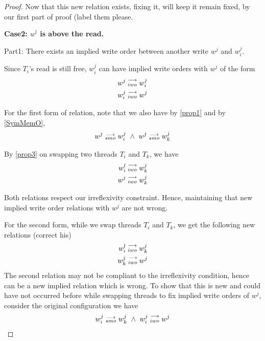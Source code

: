 \begin{proof}
                    Now that this new relation exists, fixing it, will keep it remain fixed, by our first part of proof (label them please. 
                    
            
            \textbf{Case2: $w^l$ is above the read.}
                
                Part1: There exists an implied write order between another write $w^j$ and $w_i^j$.

                Since $T_i$'s read is still free, $w_i^j$ can have implied write orders with $w^j$ of the form
                \begin{align}
                    w^j\stackrel{\longrightarrow}{_{iwo}}w_i^j \\
                    w_i^j\stackrel{\longrightarrow}{_{iwo}}w^j 
                \end{align}

                For the first form of relation, note that we also have by \ref{prop1} and by \ref{SymMemO}, 
                \begin{align}
                    \reln{w^j}{smo}{w_i^j} \ \wedge \ \reln{w^j}{smo}{w_k^j}
                \end{align}

                By \ref{prop3} on swapping two threads $T_i$ and $T_k$, we have 
                \begin{align}
                    w_i^l\stackrel{\longrightarrow}{_{iwo}}w_k^j \\
                    w^j\stackrel{\longrightarrow}{_{iwo}}w_k^j
                \end{align}

                Both relations respect our irreflexivity constraint.  Hence, maintaining that new implied write order relations with $w^j$ are not wrong.

                For the second form, while we swap threads $T_i$ and $T_k$, we get the following new relations (correct his)
                \begin{align}
                    w_i^l\stackrel{\longrightarrow}{_{iwo}}w_k^j \\
                    w_k^j\stackrel{\longrightarrow}{_{iwo}}w^j
                \end{align}
                The second relation may not be compliant to the irreflexivity condition, hence can be a new implied relation which is wrong. To show that this is new and could have not occurred before while swapping threads to fix implied write orders of $w^j$, consider the original configuration we have 
                \begin{align}
                    \reln{w_i^j}{smo}{w_k^j} \ \wedge \ \reln{w_i^j}{iwo}{w^j}
                \end{align}


\end{proof}
